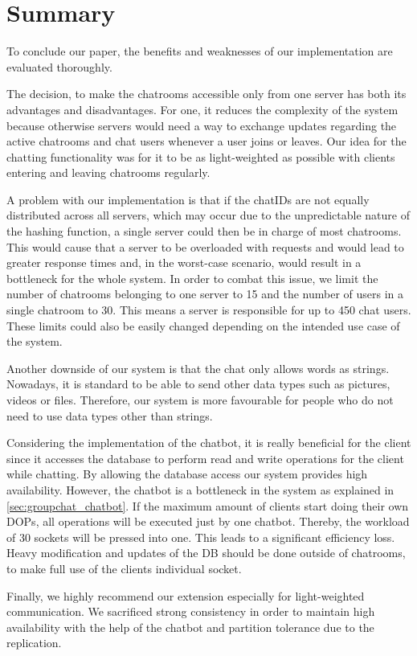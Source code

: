 \section{Summary}
\label{sec:summary}
To conclude our paper, the benefits and weaknesses of our implementation are evaluated thoroughly.

The decision, to make the chatrooms accessible only from one server has both its advantages and disadvantages. For one, it reduces the complexity of the system because otherwise servers would need a way to exchange updates regarding the active chatrooms and chat users whenever a user joins or leaves. Our idea for the chatting functionality was for it to be as light-weighted as possible with clients entering and leaving chatrooms regularly.

A problem with our implementation is that if the chatIDs are not equally distributed across all servers, which may occur due to the unpredictable nature of the hashing function, a single server could then be in charge of most chatrooms. This would cause that a server to be overloaded with requests and would lead to greater response times and, in the worst-case scenario, would result in a bottleneck for the whole system. In order to combat this issue, we limit the number of chatrooms belonging to one server to 15 and the number of users in a single chatroom to 30. This means a server is responsible for up to 450 chat users. These limits could also be easily changed depending on the intended use case of the system.

Another downside of our system is that the chat only allows words as strings. Nowadays, it is standard to be able to send other data types such as pictures, videos or files. Therefore, our system is more favourable for people who do not need to use data types other than strings.

Considering the implementation of the chatbot, it is really beneficial for the client since it accesses the database to perform read and write operations for the client while chatting. By allowing the database access our system provides high availability. However, the chatbot is a bottleneck in the system as explained in \ref{sec:groupchat_chatbot}. If the maximum amount of clients start doing their own DOPs, all operations will be executed just by one chatbot. Thereby, the workload of 30 sockets will be pressed into one. This leads to a significant efficiency loss. Heavy modification and updates of the DB should be done outside of chatrooms, to make full use of the clients individual socket.

Finally, we highly recommend our extension especially for light-weighted communication. We sacrificed strong consistency in order to maintain high availability with the help of the chatbot and partition tolerance due to the replication.